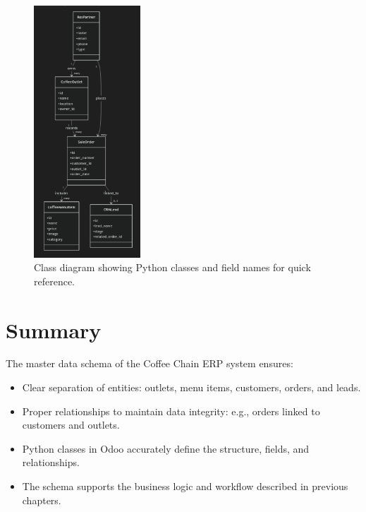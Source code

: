 \begin{figure}[H]
    \centering
    \includegraphics[width=0.356\textwidth]{diagrams/masterdata.png}
    \caption{Class diagram showing Python classes and field names for quick reference.}
\end{figure}

\section*{Summary}
The master data schema of the Coffee Chain ERP system ensures:

\begin{itemize}
    \item Clear separation of entities: outlets, menu items, customers, orders, and leads.
    \item Proper relationships to maintain data integrity: e.g., orders linked to customers and outlets.
    \item Python classes in Odoo accurately define the structure, fields, and relationships.
    \item The schema supports the business logic and workflow described in previous chapters.
\end{itemize}
